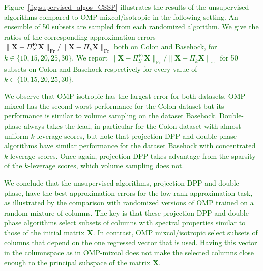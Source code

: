 \documentclass[twoside,11pt]{book}
\newcommand{\rev}[1]{\textcolor{darkgreen}{#1}}
\numberwithin{theorem}{chapter}
\numberwithin{definition}{chapter}
\numberwithin{proposition}{chapter}
\numberwithin{corollary}{chapter}
\numberwithin{example}{chapter}
\numberwithin{lemma}{chapter}
\numberwithin{assumption}{chapter}
\DeclareMathOperator{\Span}{\mathrm{Span}}
\DeclareMathOperator{\Fr}{\mathrm{Fr}}
\newcommand{\ab}[1]{\textcolor{red}{#1}}
\newcommand{\rb}[1]{\textcolor{magenta}{#1}}
\begin{document}
\rev{Figure~\ref{fig:supervised_algos_CSSP} illustrates the results of the unsupervised algorithms compared to OMP mixcol/isotropic in the following setting. An ensemble of 50 subsets are sampled from each randomized algorithm. We give the ratios of the corresponding approximation errors } $\|\bm{X} - \Pi_{S}^{\Fr}\bm{X}\|_{\Fr}/\|\bm{X} - \Pi_{k}\bm{X}\|_{\Fr}$ \rev{both on Colon and Basehock, for $k \in \{10,15,20,25,30\}$.}
\rev{We report $\|\bm{X} - \Pi_{S}^{\Fr}\bm{X}\|_{\Fr}/\|\bm{X} - \Pi_{k}\bm{X}\|_{\Fr}$ for 50 subsets on Colon and Basehock respectively for every value of $k \in \{10,15,20,25,30\}$.
}

\rev{We observe that OMP-isotropic has the largest error for both datasets. OMP-mixcol has the second worst performance for the Colon dataset but its performance is similar to volume sampling on the dataset Basehock. Double-phase always takes the lead, in particular for the Colon dataset with almost uniform $k$-leverage scores, but note that projection DPP and double phase algorithms have similar performance for the dataset Basehock with concentrated $k$-leverage scores. Once again, projection DPP takes advantage from the sparsity of the $k$-leverage scores, which volume sampling does not.}

\rev{We conclude that the unsupervised algorithms, projection DPP and double phase, have the best approximation errors for the low rank approximation task, as illustrated by the comparison with randomized versions of OMP trained on a random mixture of columns. The key is that these projection DPP and double phase algorithms select subsets of columns with spectral properties similar to those of the initial matrix $\bm{X}$. In contrast, OMP mixcol/isotropic select subsets of columns that depend on the one regressed vector that is used. Having this vector in the columnspace as in OMP-mixcol does not make the selected columns close enough to the principal subspace of the matrix $\bm{X}$.}

\end{document}
